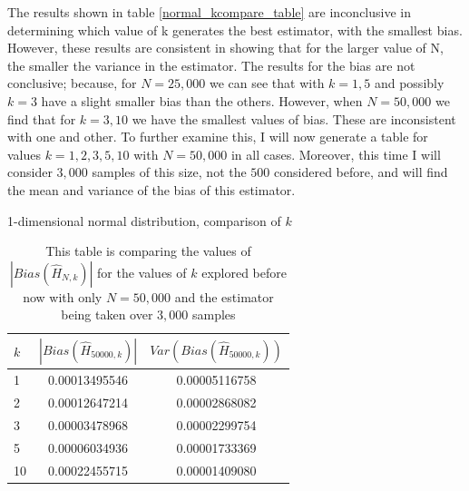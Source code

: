 \documentclass{article}
\begin{document}
The results shown in table \ref{normal_kcompare_table} are inconclusive in determining which value of k generates the best estimator, with the smallest bias. However, these results are consistent in showing that for the larger value of N, the smaller the variance in the estimator. The results for the bias are not conclusive; because, for $N=25,000$ we can see that with $k=1, 5$ and possibly $k=3$ have a slight smaller bias than the others. However, when $N=50,000$ we find that for $k=3, 10$ we have the smallest values of bias. These are inconsistent with one and other. To further examine this, I will now generate a table for values $k=1, 2, 3, 5, 10$ with $N=50,000$ in all cases. Moreover, this time I will consider $3,000$ samples of this size, not the $500$ considered before, and will find the mean and variance of the bias of this estimator.

\begin{table}
\caption{1-dimensional normal distribution, comparison of $k$} \label{normal_kcompare2_table}
\begin{center}
\begin{tabular}{| l | c c |} 
\toprule
$k$ &  $|Bias(\hat{H}_{50000, k})|$ & $Var(Bias(\hat{H}_{50000, k}))$ \\
\midrule[1pt]
1      & 0.00013495546     & 0.00005116758  \\
2      & 0.00012647214     & 0.00002868082  \\
3      & 0.00003478968     & 0.00002299754  \\
5      & 0.00006034936     & 0.00001733369  \\
10    & 0.00022455715     & 0.00001409080  \\
\hline
\end{tabular}
\\[10pt]
\caption*{This table is comparing the values of $|Bias(\hat{H}_{N, k})|$ for the values of $k$ explored before now with only $N=50,000$ and the estimator being taken over $3,000$ samples}
\end{center}
\end{table}
\end{document}

